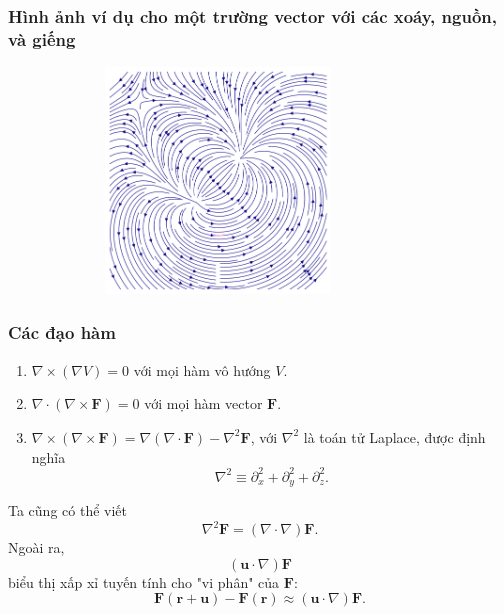 \begin{frame}
    \frametitle{Hình ảnh ví dụ cho một trường vector với các xoáy, nguồn, và giếng}
    \begin{figure}
        \centering
        \includegraphics[width=9cm, height=6cm]{Content/Figure/vector_field_expressed.jpg}
    \end{figure}
\end{frame}
\begin{frame}
    \frametitle{Các đạo hàm}
    \begin{enumerate}
        \item \(\nabla\times(\nabla V)=0\) với mọi hàm vô hướng \(V\).
        \item \(\nabla\cdot(\nabla\times \mathbf{F})=0\) với mọi hàm vector \(\mathbf{F}\).
        \item \(\nabla\times(\nabla\times \mathbf{F})=\nabla(\nabla\cdot \mathbf{F})-\nabla^2 \mathbf{F}\), với \(\nabla^2\) là toán tử Laplace, được định nghĩa 
        \[\nabla^2 \equiv \partial^{2}_x +\partial^{2}_{y}+\partial^{2}_{z}.\]
    \end{enumerate}
    Ta cũng có thể viết \[\nabla^2 \mathbf{F}=(\nabla\cdot\nabla)\mathbf{F}.\]
    \scriptsize
    Ngoài ra, \[(\mathbf{u}\cdot\nabla)\mathbf{F}\] biểu thị xấp xỉ tuyến tính cho "vi phân" của \(\mathbf{F}\):
    \vspace{-5pt}
     \[\mathbf{F}(\mathbf{r}+\mathbf{u})-\mathbf{F}(\mathbf{r})\approx (\mathbf{u}\cdot\nabla)\mathbf{F}.\]
\end{frame}
